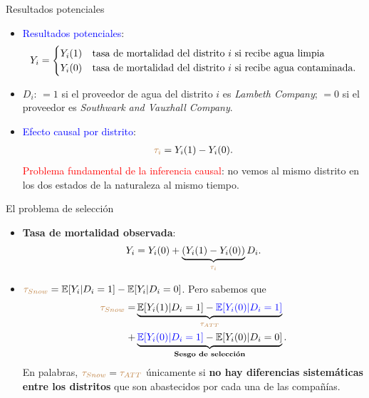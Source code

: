 \documentclass[10pt, xcolor=dvipsnames]{beamer}
\begin{document}
\begin{frame}{Resultados potenciales}
	\begin{itemize}\setlength{\itemsep}{1.0em}
	\item \textcolor{blue}{Resultados potenciales}:
    {\small    
	\begin{align*}
		Y_i = 
		\begin{cases}
		Y_i(1) &\hspace{0.3pt} \text{tasa de mortalidad del distrito $i$ si recibe agua limpia}\\
		Y_i(0) &\hspace{0.3pt} \text{tasa de mortalidad del distrito $i$ si recibe agua contaminada}.
		\end{cases}
	\end{align*}
    }
	\pause
	\item $D_i$: $=1$ si el proveedor de agua del distrito $i$ es \textit{Lambeth Company}; $=0$ si el proveedor es \textit{Southwark and Vauxhall Company}.	\smallspace
	\pause
	\item \textcolor{blue}{Efecto causal por distrito}:
	\begin{align*}
	\textcolor{brown}{\tau_i} = Y_i(1) - Y_i(0). 
	\end{align*}	
	\pause
	\textcolor{red}{Problema fundamental de la inferencia causal}: no vemos al mismo distrito en los dos estados de la naturaleza al mismo tiempo.  
\end{itemize}	
\end{frame}


\begin{frame}{El problema de selección}
\begin{itemize}
	\item \textbf{Tasa de mortalidad observada}:
	\begin{align*}
	Y_i = Y_i(0)  + \underbrace{(Y_i(1)-Y_i(0))}_{\textcolor{brown}{\tau_i}} D_i.
	\end{align*}
	\pause
	\item $\textcolor{brown}{\tau_{Snow}} = \operatorname{\mathbb{E}}[Y_i|D_i =1] - \operatorname{\mathbb{E}}[Y_i|D_i =0]$. Pero sabemos que
	\begin{equation*}
	\begin{split}
	\textcolor{brown}{\tau_{Snow}} =& \underbrace{\operatorname{\mathbb{E}}[Y_i(1)|D_i =1] - \textcolor{blue}{\operatorname{\mathbb{E}}[Y_i(0)|D_i =1]}}_{\textcolor{brown}{\tau_{ATT}}} \\
	+& \underbrace{\textcolor{blue}{\operatorname{\mathbb{E}}[Y_i(0)|D_i =1]} - \operatorname{\mathbb{E}}[Y_i(0)|D_i =0]}_{\text{\textbf{Sesgo de selección}}}. 
	\end{split}
	\end{equation*}	 
	\pause
	En palabras, $\textcolor{brown}{\tau_{Snow}}=\textcolor{brown}{\tau_{ATT}}$ únicamente si \textbf{no hay diferencias sistemáticas entre los distritos} que son abastecidos por cada una de las compañías.
\end{itemize}	
\end{frame}
\end{document}
